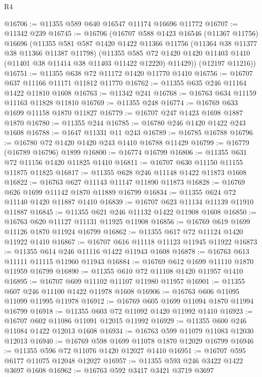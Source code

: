 \begin{lexlean}{R4}
\begin{coremodule}
@16706 := @11355 @589 @640 @16547 @11174 @16696 @11772
@16707 := @11342 @239
@16745 := @16706
    (@16707
      @588
      @1423
      @16546
      (@11367 @11756)
      @16696
      (@11355
        @581
        @587
        @1420
        @1422
        @11366
        @11756
        (@11364 @38 @11377 @38 @11366 @11387 @11798)
        (@11355
          @585
          @72
          @1420
          @1420
          @11403
          @1410
          (@11401 @38 @11414 @38 @11403 @11422 @12220)
          @11429))
      (@12197 @11216))
@16751 := @11355 @638 @72 @11172 @1420 @11770 @1410
@16756 := @16707 @637 @11166 @11171 @11812 @11770
@16762 := @11355 @635 @246 @11164 @1422 @11810 @1608
@16763 := @11342 @241
@16768 := @16763 @634 @11159 @11163 @11828 @11810
@16769 := @11355 @248
@16774 := @16769 @633 @1699 @11158 @1870 @11827
@16779 := @16707 @247 @1423 @1698 @1887 @1870
@16780 := @11355 @244
@16785 := @16780 @246 @1420 @1422 @243 @1608
@16788 := @1647 @11331 @11 @243
@16789 := @16785 @16788
@16796 := @16780 @72 @1420 @1420 @243 @1410 @16788 @11429
@16799 := @16779 (@16789 @16796) @1899
@16800 := @16774 @16799
@16806 := @11355 @631 @72 @11156 @1420 @11825 @1410
@16811 := @16707 @630 @11150 @11155 @11875 @11825
@16817 := @11355 @628 @246 @11148 @1422 @11873 @1608
@16822 := @16763 @627 @11143 @11147 @11890 @11873
@16828 := @16769 @626 @1699 @11142 @1870 @11889 @16799
@16834 := @11355 @624 @72 @11140 @1420 @11887 @1410
@16839 := @16707 @623 @11134 @11139 @11910 @11887
@16845 := @11355 @621 @246 @11132 @1422 @11908 @1608
@16850 := @16763 @620 @11127 @11131 @11925 @11908
@16856 := @16769 @619 @1699 @11126 @1870 @11924 @16799
@16862 := @11355 @617 @72 @11124 @1420 @11922 @1410
@16867 := @16707 @616 @11118 @11123 @11945 @11922
@16873 := @11355 @614 @246 @11116 @1422 @11943 @1608
@16878 := @16763 @613 @11111 @11115 @11960 @11943
@16884 := @16769 @612 @1699 @11110 @1870 @11959 @16799
@16890 := @11355 @610 @72 @11108 @1420 @11957 @1410
@16895 := @16707 @609 @11102 @11107 @11980 @11957
@16901 := @11355 @607 @246 @11100 @1422 @11978 @1608
@16906 := @16763 @606 @11095 @11099 @11995 @11978
@16912 := @16769 @605 @1699 @11094 @1870 @11994 @16799
@16918 := @11355 @603 @72 @11092 @1420 @11992 @1410
@16923 := @16707 @602 @11086 @11091 @12015 @11992
@16929 := @11355 @600 @246 @11084 @1422 @12013 @1608
@16934 := @16763 @599 @11079 @11083 @12030 @12013
@16940 := @16769 @598 @1699 @11078 @1870 @12029 @16799
@16946 := @11355 @596 @72 @11076 @1420 @12027 @1410
@16951 := @16707 @595 @6177 @11075 @12048 @12027
@16957 := @11355 @593 @246 @3422 @1422 @3697 @1608
@16962 := @16763 @592 @3417 @3421 @3719 @3697

\end{coremodule}
\end{lexlean}
